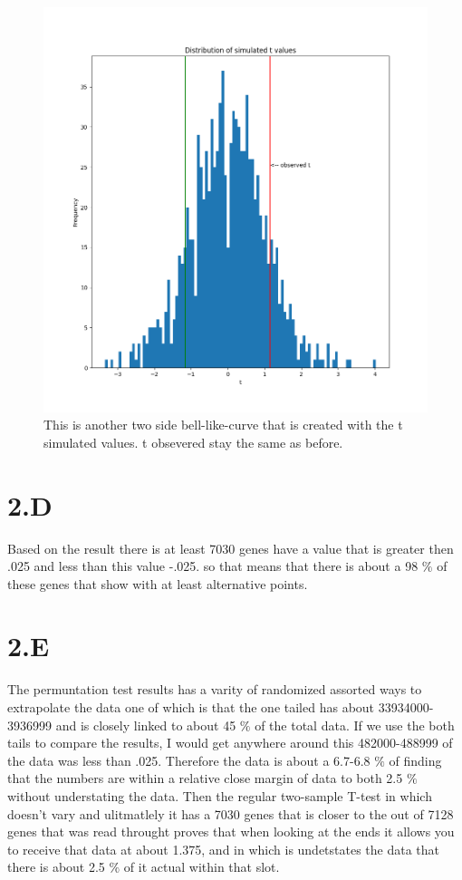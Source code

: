 \documentclass[12pt]{article}
\begin{document}
                  \begin{figure}
                 \includegraphics[width=\linewidth]{./Figure3.png}
                 \caption{This is another two side bell-like-curve that is created with the t simulated values. t obsevered stay the same as before.}
                \label{figure:graph3}
                \end{figure} 
  \part{2.D}
     Based on the result there is at least 7030 genes have a value that is greater then .025 and less than this value -.025. so that means that there is about a 98 $\%$ of these genes that show with at least alternative points. 
  \part{2.E}
 The permuntation test results has a varity of randomized assorted ways to extrapolate the data one of which is that the one tailed has about 33934000-3936999 and is closely linked to about 45 $\%$  of the total data. If we use the both tails to compare the results, I would get anywhere around this 482000-488999 of the data was less than .025. Therefore the data  is about a 6.7-6.8 $\%$ of finding that the numbers are within a relative close margin of data to both 2.5 $\%$ without understating the data.  Then the regular two-sample T-test in which doesn't vary and ulitmatlely it has a 7030 genes that is closer to the out of 7128 genes that was read throught proves that when looking at the ends it allows you to receive that data at about 1.375, and in which is undetstates the data that there is about  2.5 $\%$ of it actual within that slot.  
\end{document}
